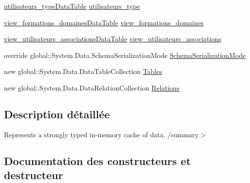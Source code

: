 \begin{DoxyCompactItemize}
\item 
\hyperlink{classforma_1_1formadb_data_set_1_1utilisateurs__type_data_table}{utilisateurs\+\_\+type\+Data\+Table} \hyperlink{classforma_1_1formadb_data_set_a1ae49a739e604d1cbd522769f4d174a4}{utilisateurs\+\_\+type}
\item 
\hyperlink{classforma_1_1formadb_data_set_1_1view__formations__domaines_data_table}{view\+\_\+formations\+\_\+domaines\+Data\+Table} \hyperlink{classforma_1_1formadb_data_set_aff503da54bb68a48a83b1f161d49faff}{view\+\_\+formations\+\_\+domaines}
\item 
\hyperlink{classforma_1_1formadb_data_set_1_1view__utilisateurs__associations_data_table}{view\+\_\+utilisateurs\+\_\+associations\+Data\+Table} \hyperlink{classforma_1_1formadb_data_set_a3fb3479c27a002f34c962c20d336ac23}{view\+\_\+utilisateurs\+\_\+associations}
\item 
override global\+::\+System.\+Data.\+Schema\+Serialization\+Mode \hyperlink{classforma_1_1formadb_data_set_ad340131156b4135ca2bf9219919b9deb}{Schema\+Serialization\+Mode}
\item 
new global\+::\+System.\+Data.\+Data\+Table\+Collection \hyperlink{classforma_1_1formadb_data_set_a5cfd857c9423f0ca07111c52382020cb}{Tables}
\item 
new global\+::\+System.\+Data.\+Data\+Relation\+Collection \hyperlink{classforma_1_1formadb_data_set_afb0c8003c1728446b3c1cff6261f481e}{Relations}
\end{DoxyCompactItemize}


\subsection{Description détaillée}
Represents a strongly typed in-\/memory cache of data. /summary$>$ 

\subsection{Documentation des constructeurs et destructeur}
